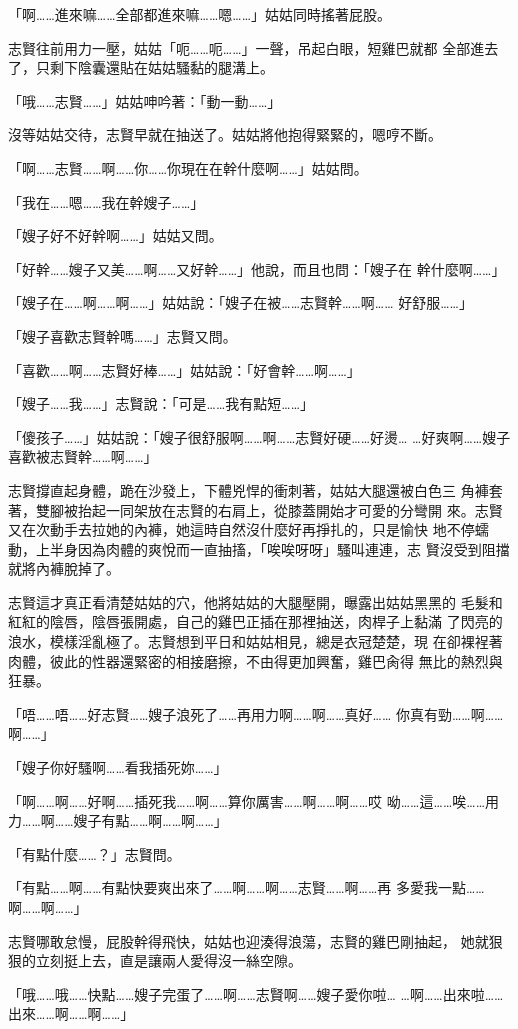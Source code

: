 「啊……進來嘛……全部都進來嘛……嗯……」姑姑同時搖著屁股。

志賢往前用力一壓，姑姑「呃……呃……」一聲，吊起白眼，短雞巴就都
全部進去了，只剩下陰囊還貼在姑姑騷黏的腿溝上。

「哦……志賢……」姑姑呻吟著：「動一動……」

沒等姑姑交待，志賢早就在抽送了。姑姑將他抱得緊緊的，嗯哼不斷。

「啊……志賢……啊……你……你現在在幹什麼啊……」姑姑問。

「我在……嗯……我在幹嫂子……」

「嫂子好不好幹啊……」姑姑又問。

「好幹……嫂子又美……啊……又好幹……」他說，而且也問：「嫂子在
幹什麼啊……」

「嫂子在……啊……啊……」姑姑說：「嫂子在被……志賢幹……啊……
好舒服……」

「嫂子喜歡志賢幹嗎……」志賢又問。

「喜歡……啊……志賢好棒……」姑姑說：「好會幹……啊……」

「嫂子……我……」志賢說：「可是……我有點短……」

「傻孩子……」姑姑說：「嫂子很舒服啊……啊……志賢好硬……好燙…
…好爽啊……嫂子喜歡被志賢幹……啊……」

志賢撐直起身體，跪在沙發上，下體兇悍的衝刺著，姑姑大腿還被白色三
角褲套著，雙腳被抬起一同架放在志賢的右肩上，從膝蓋開始才可愛的分彎開
來。志賢又在次動手去拉她的內褲，她這時自然沒什麼好再掙扎的，只是愉快
地不停蠕動，上半身因為肉體的爽悅而一直抽搐，「唉唉呀呀」騷叫連連，志
賢沒受到阻擋就將內褲脫掉了。

志賢這才真正看清楚姑姑的穴，他將姑姑的大腿壓開，曝露出姑姑黑黑的
毛髮和紅紅的陰唇，陰唇張開處，自己的雞巴正插在那裡抽送，肉桿子上黏滿
了閃亮的浪水，模樣淫亂極了。志賢想到平日和姑姑相見，總是衣冠楚楚，現
在卻裸裎著肉體，彼此的性器還緊密的相接磨擦，不由得更加興奮，雞巴肏得
無比的熱烈與狂暴。

「唔……唔……好志賢……嫂子浪死了……再用力啊……啊……真好……
你真有勁……啊……啊……」

「嫂子你好騷啊……看我插死妳……」

「啊……啊……好啊……插死我……啊……算你厲害……啊……啊……哎
呦……這……唉……用力……啊……嫂子有點……啊……啊……」

「有點什麼……？」志賢問。

「有點……啊……有點快要爽出來了……啊……啊……志賢……啊……再
多愛我一點……啊……啊……」

志賢哪敢怠慢，屁股幹得飛快，姑姑也迎湊得浪蕩，志賢的雞巴剛抽起，
她就狠狠的立刻挺上去，直是讓兩人愛得沒一絲空隙。

「哦……哦……快點……嫂子完蛋了……啊……志賢啊……嫂子愛你啦…
…啊……出來啦……出來……啊……啊……」

